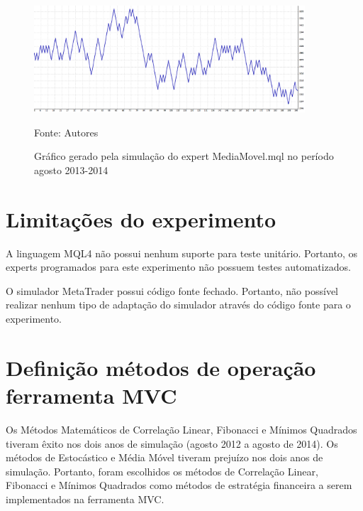 \begin{figure}[htp]
\centering
\includegraphics[width=0.9\textwidth]{figuras/protocoloMedia4}
\caption{ Gráfico gerado pela simulação do expert MediaMovel.mql no período agosto 2013-2014}{Fonte: Autores} 
\label{protocoloMedia4}
\end{figure}

\section{Limitações do experimento}

A linguagem MQL4 não possui nenhum suporte para teste unitário. Portanto, os experts programados para este experimento não possuem testes automatizados. 

O simulador MetaTrader possui código fonte fechado. Portanto, não possível realizar nenhum tipo de adaptação do simulador através do código fonte para o experimento.

\section{Definição métodos de operação ferramenta MVC}

Os Métodos Matemáticos de Correlação Linear, Fibonacci e Mínimos Quadrados tiveram êxito nos dois anos de simulação (agosto 2012 a agosto de 2014). Os métodos de Estocástico e Média Móvel tiveram prejuízo nos dois anos de simulação. Portanto, foram escolhidos os métodos de Correlação Linear, Fibonacci e Mínimos Quadrados como métodos de estratégia financeira a serem implementados na ferramenta MVC.
